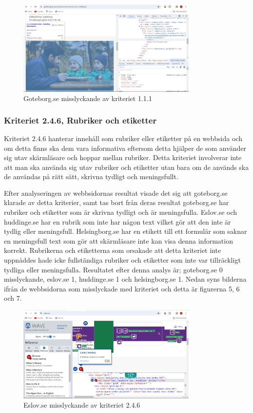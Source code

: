 \documentclass[11p]{article}
\begin{document}
    \begin{figure}[hbt!]
        \includegraphics[width=0.8\textwidth]{../images/Goteborg111.jpg}
        \caption{ Goteborg.se misslyckande av kriteriet 1.1.1 }
    \end{figure}

    \subsubsection{Kriteriet 2.4.6, Rubriker och etiketter}
    Kriteriet 2.4.6 hanterar innehåll som rubriker eller etiketter på en webbsida och om detta finns ska dem vara informativa eftersom detta hjälper de som använder sig utav skärmläsare och hoppar mellan rubriker.
    Detta kriteriet involverar inte att man ska använda sig utav rubriker och etiketter utan bara om de används ska de användas på rätt sätt, skrivna tydligt och meningsfullt.

    Efter analyseringen av webbsidornas resultat visade det sig att goteborg.se klarade av detta kriterier, samt tas bort från deras resultat
    goteborg.se har rubriker och etiketter som är skrivna tydligt och är meningsfulla.
    Eslov.se och huddinge.se har en rubrik som inte har någon text vilket gör att den inte är tydlig eller meningsfull.
    Helsingborg.se har en etikett till ett formulär som saknar en meningsfull text som gör att skärmläsare inte kan visa denna information korrekt.
    Rubrikerna och etiketterna som orsakade att detta kriteriet inte uppnåddes hade icke fullständiga rubriker och etiketter som inte var tillräckligt tydliga eller meningsfulla.
    Resultatet efter denna analys är; goteborg.se 0 misslyckande, eslov.se 1, huddinge.se 1 och helsingborg.se 1.
    Nedan syns bilderna ifrån de webbsidorna som misslyckade med kriteriet och detta är figurerna 5, 6 och 7.

    \begin{figure}[hbt!]
        \includegraphics[width=0.8\textwidth]{../images/Eslov246.jpg}
        \caption{ Eslov.se misslyckande av kriteriet 2.4.6 }
    \end{figure}
\end{document}
